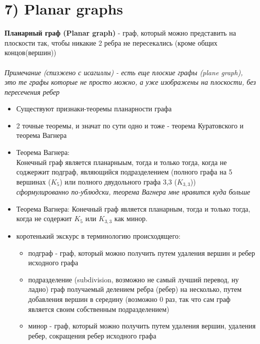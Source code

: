 \documentclass[../TM3-UltraDoc.tex]{subfiles}
\begin{document}
	\section*{7) Planar graphs}
	\textbf{Планарный граф (Planar graph)} - граф, который можно представить на плоскости так, чтобы никакие 2 ребра не пересекались (кроме общих концов(вершин))\\
	\\
	\textit{Примечание (спизжено с исагиллы) - есть еще плоские графы (plane graph), это те графы которые не просто можно, а уже изображены на плоскости, без пересечения ребер}\\
	\small
	\begin{tcolorbox}[colframe=gray!50!black, left=5pt, right=5pt, top=5pt, bottom=5pt, boxrule=1pt, colback=gray!10!white, title=\text{Ладно, теперь поговорим серьезно}]
		\begin {itemize}
		\item Существуют признаки-теоремы планарности графа
		\item 2 точные теоремы, и значат по сути одно и тоже - теорема Куратовского и теорема Вагнера
		\item Теорема Вагнера:\\
		Конечный граф является планарныым, тогда и только тогда, когда не соджержит подграф, являющийся подразделением (полного графа на 5 вершинах ($K_5$) или полного двудольного графа 3,3 ($K_{3,3}$))\\
		\textit{сформулированно по-ублюдски, теорема Вагнера мне нравится куда больше}
		\item Теорема Вагнера:
		Конечный граф является планарным, тогда и только тогда, когда не содержит $K_5$ или $K_{3,3}$ как минор.
		\item коротенький экскурс в терминологию происходящего:
			\begin{itemize}
				\item подграф - граф, который можно получить путем удаления вершин и ребер исходного графа
				\item подразделение (subdivision, возможно не самый лучший перевод, ну ладно) граф получаемый делением ребра (ребер) на несколько, путем добавления вершин в середину (возможно 0 раз, так что сам граф является своим собственным подразделением)
				\item минор - граф, который можно получить путем удаления вершин, удаления ребер, сокращения ребер исходного графа
			\end{itemize}

\end{itemize}
\end{tcolorbox}
\end{document}
